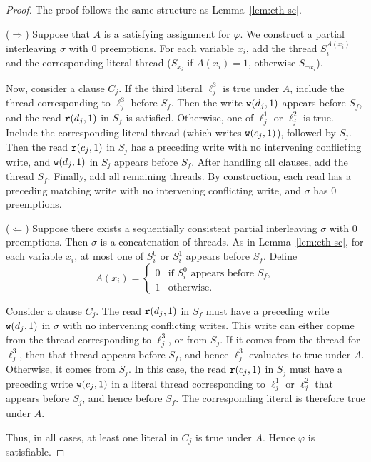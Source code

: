 \begin{proof}
    The proof follows the same structure as Lemma~\ref{lem:eth-sc}.

    ($\Rightarrow$) Suppose that $A$ is a satisfying assignment for $\varphi$. We construct a partial interleaving $\sigma$ with $0$ preemptions.
    For each variable $x_i$, add the thread $S_i^{A(x_i)}$ and the corresponding literal thread ($S_{x_i}$ if $A(x_i)=1$, otherwise $S_{\neg x_i}$).

    Now, consider a clause $C_j$. If the third literal $\ell_j^3$ is true under $A$, include the thread corresponding to $\ell_j^3$ before $S_f$. Then the write $\mathtt{w}(d_j,1)$ appears before $S_f$, and the read $\mathtt{r}(d_j,1)$ in $S_f$ is satisfied.
    Otherwise, one of $\ell_j^1$ or $\ell_j^2$ is true. 
    Include the corresponding literal thread (which writes $\mathtt{w}(c_j,1)$), followed by $S_j$. Then the read $\mathtt{r}(c_j,1)$ in $S_j$ has a preceding write with no intervening conflicting write, and $\mathtt{w}(d_j,1)$ in $S_j$ appears before $S_f$.
    After handling all clauses, add the thread $S_f$. Finally, add all remaining threads. By construction, each read has a preceding matching write with no intervening conflicting write, and $\sigma$ has $0$ preemptions.

\medskip

    ($\Leftarrow$) Suppose there exists a sequentially consistent partial interleaving $\sigma$ with $0$ preemptions. Then $\sigma$ is a concatenation of threads. As in Lemma~\ref{lem:eth-sc}, for each variable $x_i$, at most one of $S_i^0$ or $S_i^1$ appears before $S_f$. Define
\[
A(x_i) =
\begin{cases}
0 & \text{if } S_{i}^0 \text{ appears before } S_f,\\
1 & \text{otherwise.}
\end{cases}
\]

    Consider a clause $C_j$. The read $\mathtt{r}(d_j,1)$ in $S_f$ must have a preceding write $\mathtt{w}(d_j,1)$ in $\sigma$ with no intervening conflicting writes. This write can either copme from the thread corresponding to $\ell_j^3$, or from $S_{j}$. If it comes from the thread for $\ell_j^3$, then that thread appears before $S_f$, and hence $\ell_j^3$ evaluates to true under $A$.
    Otherwise, it comes from $S_{j}$. In this case, the read $\mathtt{r}(c_j,1)$ in $S_{j}$ must have a preceding write $\mathtt{w}(c_j,1)$ in a literal thread corresponding to $\ell_j^1$ or $\ell_j^2$ that appears before $S_{j}$, and hence before $S_f$. The corresponding literal is therefore true under $A$.

    Thus, in all cases, at least one literal in $C_j$ is true under $A$. Hence $\varphi$ is satisfiable.\qedhere
\end{proof}






